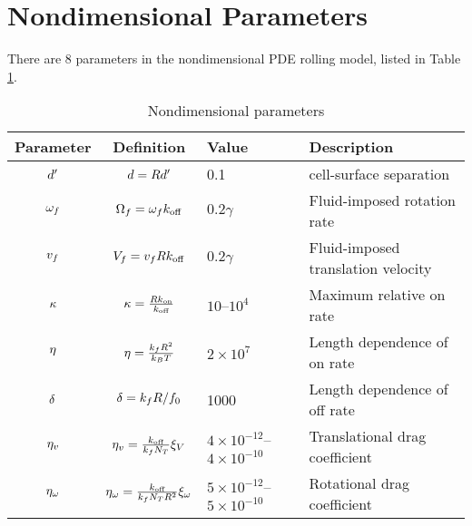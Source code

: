 \documentclass{article}
\begin{document}
\section{Nondimensional Parameters}
\label{sec:nd-params}

There are 8 parameters in the nondimensional PDE rolling model, listed
in Table \ref{tab:nd-params}.

\begin{table}
  \centering
  \begin{tabular}{c|c|l|l}
    Parameter & Definition & Value & Description \\ \hline
    $d'$ & $d = Rd'$ & 0.1
                                   & cell-surface separation \\
    $\omega_f$ & $\Omega_f = \omega_fk_\text{off}$
                           & $0.2\gamma$ & Fluid-imposed rotation rate
    \\
    $v_f$ & $V_f = v_fRk_\text{off}$
                           & $0.2\gamma$ & Fluid-imposed translation
                                           velocity \\
    $\kappa$ & $\kappa = \frac{Rk_\text{on}}{k_\text{off}}$
                           & $10$--$10^4$ & Maximum relative on rate \\
    $\eta$ & $\eta =
                    \frac{k_fR^2}{k_BT}$
                           & $2 \times 10^7$ & Length dependence of on
                                               rate \\
    $\delta$ & $\delta = k_fR/f_0$
                           & 1000 & Length dependence of off rate \\
    $\eta_v$ & $\eta_v =
                     \frac{k_\text{off}}{k_fN_T}
                     \xi_V$ & $4 \times 10^{-12}$--$4 \times
                                     10^{-10}$
                                   & Translational drag coefficient \\
    $\eta_\omega$ & $\eta_\omega =
                     \frac{k_\text{off}}{k_fN_T
                                      R^2}\xi_\omega$
                           & $5 \times 10^{-12}$--$5 \times 10^{-10}$
                                   & Rotational drag coefficient
  \end{tabular}
  \caption{Nondimensional parameters}
  \label{tab:nd-params}
\end{table}


\end{document}
